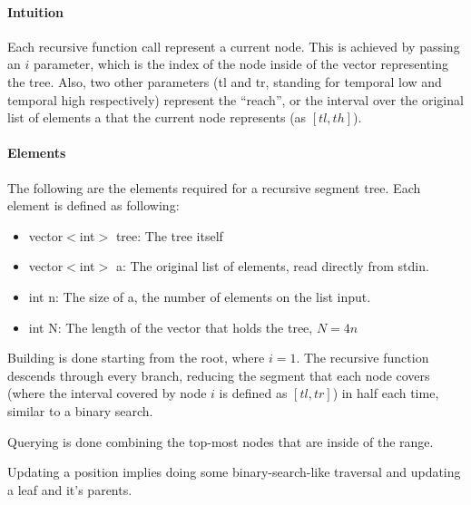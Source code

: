 \documentclass[a4paper,10pt,twocolumn, titlepage]{article}
\begin{document}
\paragraph{Intuition} Each recursive function call represent a current node. This is achieved by passing an $i$ parameter, which is the index of the node inside of the vector representing the tree. Also, two other parameters (tl and tr, standing for temporal low and temporal high respectively) represent the ``reach'', or the interval over the original list of elements a that the current node represents (as $[tl, th]$).

\paragraph{Elements} The following are the elements required for a recursive segment tree. Each element is defined as following:

\begin{itemize}
 \item vector$<$int$>$ tree: The tree itself
 \item vector$<$int$>$ a: The original list of elements, read directly from stdin.
 \item int n: The size of a, the number of elements on the list input.
 \item int N: The length of the vector that holds the tree, $N=4n$
\end{itemize}



Building is done starting from the root, where $i=1$. The recursive function descends through every branch, reducing the segment that each node covers (where the interval covered by node $i$ is defined as $[tl, tr]$) in half each time, similar to a binary search.



Querying is done combining the top-most nodes that are inside of the range.



Updating a position implies doing some binary-search-like traversal and updating a leaf and it's parents.


\end{document}
